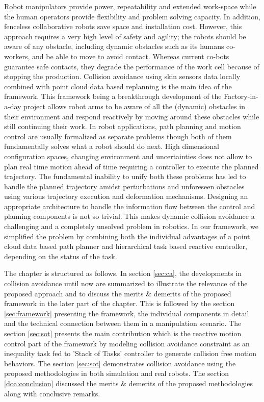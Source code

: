 Robot manipulators provide power, repeatability and extended work-space while the human operators provide flexibility and problem solving capacity. In addition, fenceless collaborative robots save space and installation cost. However, this approach requires a very high level of safety and agility; the robots should be aware of any obstacle, including dynamic obstacles such as its humans co-workers, and be able to move to avoid contact. Whereas current co-bots guarantee safe contacts, they degrade the performance of the work cell because of stopping the production. Collision avoidance using skin sensors data locally combined with point cloud data based replanning is the main idea of the framework. This framework being a breakthrough development of the Factory-in-a-day project allows robot arms to be aware of all the (dynamic) obstacles in their environment and respond reactively by moving around these obstacles while still continuing their work. In robot applications, path planning and motion control are usually formalized as separate problems though both of them fundamentally solves what a robot should do next. High dimensional configuration spaces, changing environment and uncertainties does not allow to plan real time motion ahead of time requiring a controller to execute the planned trajectory. The fundamental inability to unify both these problems has led to handle the planned trajectory amidst perturbations and unforeseen obstacles using various trajectory execution and deformation mechanisms. Designing an appropriate architecture to handle the information flow between the control and planning components is not so trivial. This makes dynamic collision avoidance a challenging and a completely unsolved problem in robotics. In our framework, we simplified the problem by combining both the individual advantages of a point cloud data based path planner and hierarchical task based reactive controller, depending on the status of the task. 

The chapter is structured as follows. In section \ref{sec:ca}, the developments in collision avoidance until now are summarized to illustrate the relevance of the proposed approach and to discuss the merits \& demerits of the proposed framework in the later part of the chapter. This is followed by the section \ref{sec:framework} presenting the framework, the individual components in detail and the technical connection between them in a manipulation scenario. The section \ref{sec:sot} presents the main contribution which is the reactive motion control part of the framework by modeling collision avoidance constraint as an inequality task fed to 'Stack of Tasks' controller to generate collision free motion behaviors. The section \ref{sec:sot} demonstrates collision avoidance using the proposed methodologies in both simulation and real robots. The section \ref{doa:conclusion} discussed the merits \& demerits of the proposed methodologies along with conclusive remarks.  
